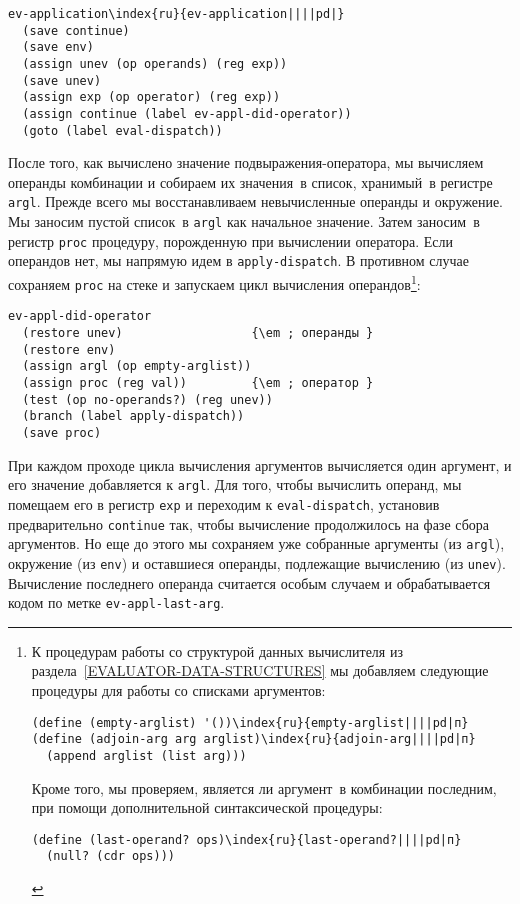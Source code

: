 \pagebreak

\begin{Verbatim}[fontsize=\small]
ev-application\index{ru}{ev-application||||pd|}
  (save continue)
  (save env)
  (assign unev (op operands) (reg exp))
  (save unev)
  (assign exp (op operator) (reg exp))
  (assign continue (label ev-appl-did-operator))
  (goto (label eval-dispatch))
\end{Verbatim}

После того, как вычислено значение
подвыражения-оператора, мы вычисляем 
операнды комбинации и собираем их 
значения~в список, хранимый~в регистре {\tt argl}.  Прежде
всего мы восстанавливаем невычисленные операнды и окружение.  Мы
заносим пустой список~в {\tt argl} как начальное значение.
Затем заносим~в регистр {\tt proc} процедуру, порожденную
при вычислении оператора.  Если операндов нет, мы напрямую идем в
{\tt apply-dispatch}.  В противном случае сохраняем
{\tt proc} на стеке и запускаем цикл вычисления
операндов\footnote{К процедурам работы со структурой данных вычислителя
из раздела~\ref{EVALUATOR-DATA-STRUCTURES} мы добавляем
следующие процедуры для работы со списками аргументов:

\begin{Verbatim}
(define (empty-arglist) '())\index{ru}{empty-arglist||||pd|п}
(define (adjoin-arg arg arglist)\index{ru}{adjoin-arg||||pd|п}
  (append arglist (list arg)))
\end{Verbatim}
Кроме того, мы проверяем, является ли аргумент~в комбинации последним,
при помощи дополнительной синтаксической процедуры:

\begin{Verbatim}
(define (last-operand? ops)\index{ru}{last-operand?||||pd|п}
  (null? (cdr ops)))
\end{Verbatim}
}: %

\begin{Verbatim}[fontsize=\small]
ev-appl-did-operator
  (restore unev)                  {\em ; операнды }
  (restore env)
  (assign argl (op empty-arglist))
  (assign proc (reg val))         {\em ; оператор }
  (test (op no-operands?) (reg unev))
  (branch (label apply-dispatch))
  (save proc)
\end{Verbatim}

При каждом проходе цикла вычисления аргументов
вычисляется один аргумент, и его значение добавляется к
{\tt argl}.  Для того, чтобы вычислить операнд, мы помещаем его
в регистр {\tt exp} и переходим к {\tt eval-dispatch},
установив предварительно {\tt continue} так, чтобы вычисление
продолжилось на фазе сбора аргументов.  Но еще до этого мы
сохраняем уже собранные аргументы (из {\tt argl}), окружение
(из {\tt env}) и оставшиеся операнды, подлежащие вычислению (из
{\tt unev}).  Вычисление последнего операнда считается особым
случаем и обрабатывается кодом по метке {\tt ev-appl-last-arg}.


